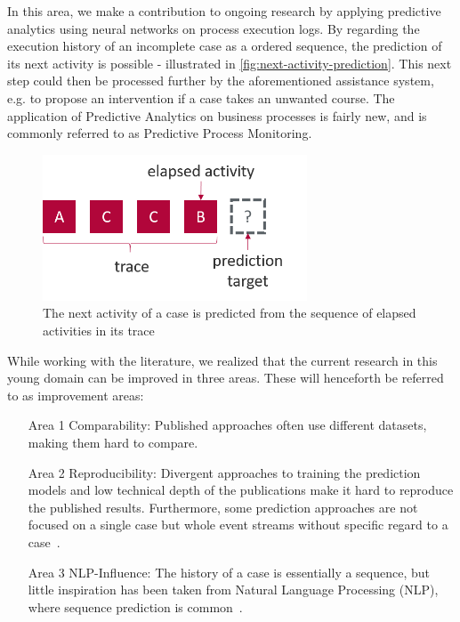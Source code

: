In this area, we make a contribution to ongoing research by applying predictive analytics using neural networks on process execution logs. By regarding the execution history of an incomplete case as a ordered sequence, the prediction of its next activity is possible - illustrated in \autoref{fig:next-activity-prediction}. This next step could then be processed further by the aforementioned assistance system, e.g. to propose an intervention if a case takes an unwanted course. The application of Predictive Analytics on business processes is fairly new, and is commonly referred to as Predictive Process Monitoring.

\begin{figure}
    \centering
    \includegraphics[width=0.7\textwidth]{gfx/next-activity.png}
    \caption[Next-activity prediction from a trace]{The next activity of a case is predicted from the sequence of elapsed activities in its trace}
    \label{fig:next-activity-prediction}
\end{figure}

While working with the literature, we realized that the current research in this young domain can be improved in three areas. These will henceforth be referred to as improvement areas:

\begin{enumerate}
    \item[Area 1] Comparability: Published approaches often use different datasets, making them hard to compare.
    \item[Area 2] Reproducibility: Divergent approaches to training the prediction models and low technical depth of the publications make it hard to reproduce the published results. Furthermore, some prediction approaches are not focused on a single case but whole event streams without specific regard to a case~\cite{evermann2016, schoenig2018}.
    \item[Area 3] NLP-Influence: The history of a case is essentially a sequence, but little inspiration has been taken from Natural Language Processing (NLP), where sequence prediction is common~\cite{shibata2016bipartite}.
\end{enumerate}

